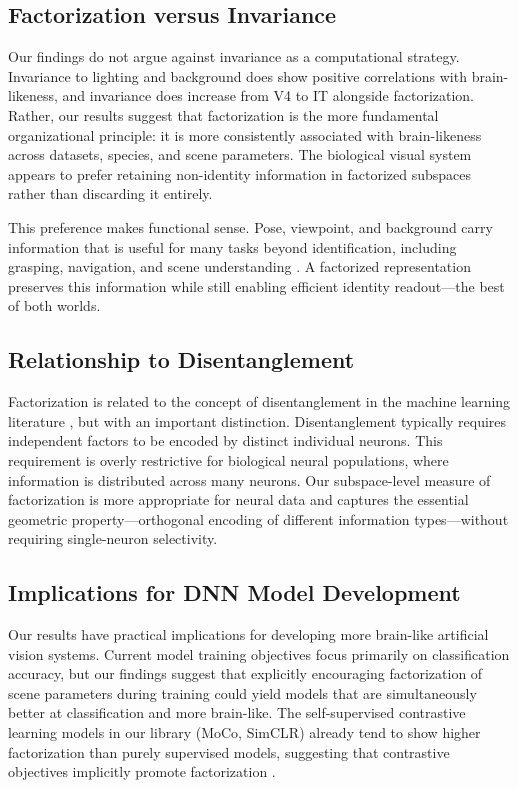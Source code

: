 \documentclass[11pt]{article}
\begin{document}
\subsection{Factorization versus Invariance}

Our findings do not argue against invariance as a computational strategy. Invariance to lighting and background does show positive correlations with brain-likeness, and invariance does increase from V4 to IT alongside factorization. Rather, our results suggest that factorization is the more fundamental organizational principle: it is more consistently associated with brain-likeness across datasets, species, and scene parameters. The biological visual system appears to prefer retaining non-identity information in factorized subspaces rather than discarding it entirely.

This preference makes functional sense. Pose, viewpoint, and background carry information that is useful for many tasks beyond identification, including grasping, navigation, and scene understanding \citep{hong2016}. A factorized representation preserves this information while still enabling efficient identity readout---the best of both worlds.

\subsection{Relationship to Disentanglement}

Factorization is related to the concept of disentanglement in the machine learning literature \citep{higgins2018, bengio2013}, but with an important distinction. Disentanglement typically requires independent factors to be encoded by distinct individual neurons. This requirement is overly restrictive for biological neural populations, where information is distributed across many neurons. Our subspace-level measure of factorization is more appropriate for neural data and captures the essential geometric property---orthogonal encoding of different information types---without requiring single-neuron selectivity.

\subsection{Implications for DNN Model Development}

Our results have practical implications for developing more brain-like artificial vision systems. Current model training objectives focus primarily on classification accuracy, but our findings suggest that explicitly encouraging factorization of scene parameters during training could yield models that are simultaneously better at classification and more brain-like. The self-supervised contrastive learning models in our library (MoCo, SimCLR) already tend to show higher factorization than purely supervised models, suggesting that contrastive objectives implicitly promote factorization \citep{he2020moco, chen2020simclr}.
\end{document}

